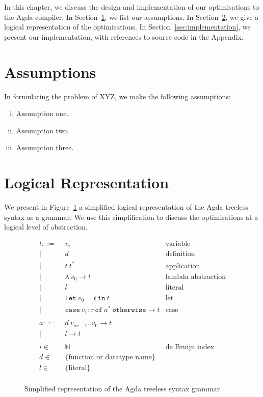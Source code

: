 In this chapter, we discuss the design and implementation of our optimisations to the Agda compiler. In Section~\ref{sec:assumptions}, we list our assumptions. In Section~\ref{sec:logical_representation}, we give a logical representation of the optimisations. In Section~\ref{sec:implementation}, we present our implementation, with references to source code in the Appendix.

\section{Assumptions}
\label{sec:assumptions}

In formulating the problem of XYZ, we make the following assumptions: 
\begin{enumerate}[(i)]
	\item Assumption one. 
	\item Assumption two. 
	\item Assumption three. 
\end{enumerate}


\section{Logical Representation}
\label{sec:logical_representation}

We present in Figure~\ref{fig:treeless_grammar} a simplified logical representation of the Agda treeless syntax as a grammar. We use this simplification to discuss the optimisations at a logical level of abstraction.

\begin{figure}
\begin{align*}
t ::=~& v_i & \text{variable}\\
|~& d & \text{definition}\\
|~& t~t^* & \text{application}\\
|~& \lambda~v_0 \to t & \text{lambda abstraction}\\
|~& l & \text{literal}\\
|~& \mathtt{let}~v_0 = t~\mathtt{in}~t & \text{let}\\
|~& \mathtt{case}~v_i : \tau~\mathtt{of}~a^*~\mathtt{otherwise} \to t& \text{case}\\
\\
a ::=~& d~v_{ar-1}..v_0 \to t\\
|~& l \to t\\
\\
i \in~& \mathbb{N} & \text{de Bruijn index}\\
d \in~& \{\text{function or datatype name}\}\\
l \in~& \{\text{literal}\}\\
\end{align*}
\caption{Simplified representation of the Agda treeless syntax grammar.}
\label{fig:treeless_grammar}
\end{figure}

